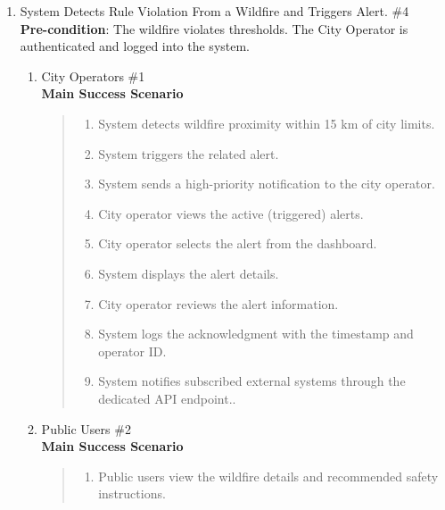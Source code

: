 \documentclass[]{article}
\begin{document}
\begin{enumerate}[{\bf BE4.}]
	\item System Detects Rule Violation From a Wildfire and Triggers Alert. \#4 \\         
    \textbf{Pre-condition}: The wildfire violates thresholds. The City Operator is authenticated and logged into the system.
    
		\begin{enumerate}[{\bf VP1.}]
			\item City Operators \#1 \\
                \textbf{Main Success Scenario} 
                    \begin{quote}
                    \begin{enumerate}[1.]
                        \item System detects wildfire proximity within 15 km of city limits.
                        \item System triggers the related alert.
                        \item System sends a high-priority notification to the city operator.
                        \item City operator views the active (triggered) alerts.
                        \item City operator selects the alert from the dashboard.
                        \item System displays the alert details.
                        \item City operator reviews the alert information.
                        \item System logs the acknowledgment with the timestamp and operator ID.
                        \item System notifies subscribed external systems through the dedicated API endpoint..
                    \end{enumerate}
                    \end{quote}
                
			\item Public Users \#2 \\
                \textbf{Main Success Scenario} 
                    \begin{quote}
                    \begin{enumerate}[1.]
                        \item Public users view the wildfire details and recommended safety instructions.
                    \end{enumerate}
                    \end{quote}
                

\end{enumerate}
\end{enumerate}
\end{document}
